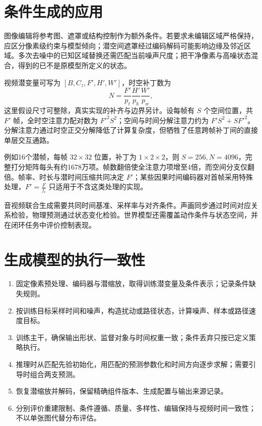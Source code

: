 \documentclass[../textbook.tex]{subfiles}
\begin{document}
\section{条件生成的应用}
\optional
图像编辑将参考图、遮罩或结构控制作为额外条件。若要求未编辑区域严格保持，应区分像素级约束与模型倾向；潜空间遮罩经过编码解码可能影响边缘及邻近区域。多次去噪中的已知区域替换还需匹配当前噪声尺度；把干净像素与高噪状态混合，得到的已不是原模型所定义的状态。

视频潜变量可写为 $[B,C_z,F',H',W']$，时空补丁数为
\begin{equation}
 N=\frac{F'}{p_t}\frac{H'}{p_h}\frac{W'}{p_w},
\end{equation}
这里假设尺寸可整除，真实实现的补齐与边界另计。设每帧有 $S$ 个空间位置，共 $F'$ 帧，全时空注意力配对数为 $F'^2S^2$；空间与时间分解注意力约为 $F'S^2+SF'^2$。分解注意力通过时空正交分解降低了计算复杂度，但牺牲了任意跨帧补丁间的直接单层交互通路。

\optional
\begin{example}[视频潜序列的注意力规模]
例如16个潜帧，每帧 $32\times32$ 位置，补丁为 $1\times2\times2$，则 $S=256,N=4096$，完整打分矩阵每头有约1678万项。帧数翻倍使全注意力项增至4倍，而空间分支仅翻倍。帧率、时长与潜时间压缩共同决定 $F'$；某些因果时间编码器对首帧采用特殊处理，$F'=\frac{F}{f_t}$ 只适用于不含这类处理的实现。
\end{example}

音视频联合生成需要共同时间基准、采样率与对齐条件。声画同步通过时间对应关系检验，物理预测通过状态变化检验。世界模型还需覆盖动作条件与状态空间，并在闭环任务中评价控制表现。

\section{生成模型的执行一致性}

\begin{algorithm}[条件潜空间生成的数据流]

\begin{enumerate}
\item 固定像素预处理、编码器与潜缩放，取得训练潜变量及条件表示；记录条件缺失规则。
\item 按训练目标采样时间和噪声，构造扰动或路径状态，计算噪声、样本或路径速度目标。
\item 训练主干，确保输出形状、监督对象与时间权重一致；条件丢弃只按已定义策略执行。
\item 推理时从匹配先验初始化，用匹配的预测参数化和时间方向逐步求解；需要引导时组合两支预测。
\item 恢复潜缩放并解码，保留精确组件版本、生成配置与输出来源记录。
\item 分别评价重建限制、条件遵循、质量、多样性、编辑保持与视频时间一致性；不以单张图代替分布评估。
\end{enumerate}
\end{algorithm}
\end{document}
